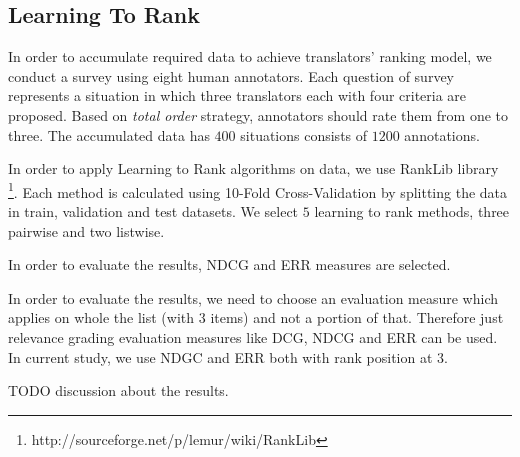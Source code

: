 \begin{table}
\begin{center}
\caption{P-Value of Significance of Correlation Test Algorithms}
\label{table:signtest}
\end{center}
\end{table}

\subsection{Learning To Rank}
In order to accumulate required data to achieve translators' ranking model, we conduct a survey using eight human annotators. Each question of survey represents a situation in which three translators each with four criteria are proposed. Based on \textit{total order} strategy, annotators should rate them from one to three. The accumulated data has $400$ situations consists of $1200$ annotations.

In order to apply Learning to Rank algorithms on data, we use RankLib library \footnote{http://sourceforge.net/p/lemur/wiki/RankLib}. Each method is calculated using 10-Fold Cross-Validation by splitting the data in train, validation and test datasets. We select $5$ learning to rank methods, three pairwise and two listwise. 

In order to evaluate the results, NDCG and ERR measures are selected. 

In order to evaluate the results, we need to choose an evaluation measure which applies on whole the list (with $3$ items) and not a portion of that. Therefore just relevance grading evaluation measures like DCG, NDCG and ERR can be used. In current study, we use NDGC and ERR both with rank position at $3$.

TODO discussion about the results.

